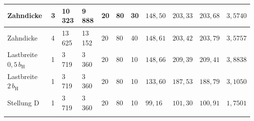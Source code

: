 \begin{table}[htbp]
\begin{tabular}{L{2.1cm}llllllllll}
        \hline
        Zahndicke & 3 & 10\,323 & 9\,888 & 20 & 80 & 30 & $148{,}50$ & $203{,}33$ & $203{,}68$ & $3{,}5740$ \\
        \hline
        Zahndicke & 4 & 13\,625 & 13\,152 & 20 & 80 & 40 & $148{,}61$ & $203{,}42$ & $203{,}79$ & $3{,}5757$ \\
        \hline
        Lastbreite $0{,}5\,b_{\mathrm{H}}$ & 1 & 3\,719 & 3\,360 & 20 & 80 & 10 & $148{,}66$ & $209{,}39$ & $209{,}41$ & $3{,}8838$ \\
        \hline
        Lastbreite $2\,b_{\mathrm{H}}$ & 1 & 3\,719 & 3\,360 & 20 & 80 & 10 & $133{,}60$ & $187{,}53$ & $188{,}79$ & $3{,}1050$ \\
        \hline
        Stellung D & 1 & 3\,719 & 3\,360 & 20 & 80 & 10 & $99{,}16$ & $101{,}30$ & $100{,}91$ & $1{,}7501$ \\
        \hline
    \end{tabular}
\end{table}
